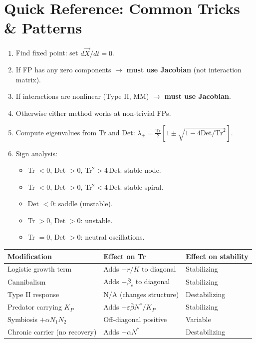 \documentclass[10pt]{article}
\begin{document}
\newpage
\section{Quick Reference: Common Tricks \& Patterns}

\begin{tcolorbox}[colback=yellow!5,colframe=orange!70!black,title=\textbf{Stability Decision Tree}]
\begin{enumerate}
\item Find fixed point: set $d\vec X/dt = 0$.
\item If FP has any zero components $\to$ \textbf{must use Jacobian} (not interaction matrix).
\item If interactions are nonlinear (Type II, MM) $\to$ \textbf{must use Jacobian}.
\item Otherwise either method works at non-trivial FPs.
\item Compute eigenvalues from Tr and Det:
$\lambda_\pm = \frac{\text{Tr}}{2}\left[1 \pm \sqrt{1 - 4\text{Det}/\text{Tr}^2}\right]$.
\item Sign analysis:
\begin{itemize}
\item Tr $<0$, Det $>0$, Tr$^2 > 4\,$Det: stable node.
\item Tr $<0$, Det $>0$, Tr$^2 < 4\,$Det: stable spiral.
\item Det $<0$: saddle (unstable).
\item Tr $>0$, Det $>0$: unstable.
\item Tr $=0$, Det $>0$: neutral oscillations.
\end{itemize}
\end{enumerate}
\end{tcolorbox}

\begin{tcolorbox}[colback=blue!3,colframe=blue!70!black,title=\textbf{Common Modifications and Their Effects}]
\begin{tabular}{lll}
\textbf{Modification} & \textbf{Effect on Tr} & \textbf{Effect on stability}\\\hline
Logistic growth term & Adds $-r/K$ to diagonal & Stabilizing\\
Cannibalism & Adds $-\bar\beta_c$ to diagonal & Stabilizing\\
Type II response & N/A (changes structure) & Destabilizing\\
Predator carrying $K_P$ & Adds $-\varepsilon\bar\beta N^*/K_P$ & Stabilizing\\
Symbiosis $+\alpha N_1 N_2$ & Off-diagonal positive & Variable\\
Chronic carrier (no recovery) & Adds $+\alpha N^*$ & Destabilizing\\
\end{tabular}
\end{tcolorbox}
\end{document}
